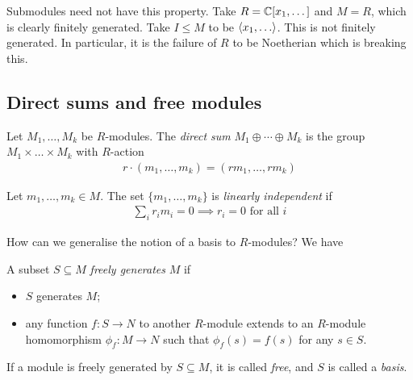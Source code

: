 \documentclass{../../template/note}
\begin{document}
    \begin{remark*}
        Submodules need not have this property. Take $R=\mathbb C[x_1, \dots]$ and $M=R$, which is clearly finitely generated. Take $I \leq M$ to be $\gen{x_1, \dots}$. This is not finitely generated. In particular, it is the failure of $R$ to be Noetherian which is breaking this.
    \end{remark*}
    

    \subsection{Direct sums and free modules}

    \begin{definition}
        Let $M_1, \dots, M_k$ be $R$-modules. The \emph{direct sum} $M_1 \oplus \cdots \oplus M_k$ is the group $M_1 \times \dots \times M_k$ with $R$-action
        \begin{align*}
            r \cdot (m_1, \dots, m_k) = (rm_1, \dots, rm_k)
        \end{align*}
    \end{definition}
    
    \begin{definition}
        Let $m_1, \dots, m_k \in M$. The set $\{m_1, \dots, m_k\}$ is \emph{linearly independent} if
        \begin{align*}
            \sum_i r_im_i = 0 \implies r_i = 0 \text{ for all }i
        \end{align*}
    \end{definition}

    How can we generalise the notion of a basis to $R$-modules? We have

    \begin{definition}
        A subset $S \subseteq M$ \emph{freely generates} $M$ if
        \begin{itemize}
            \item $S$ generates $M$;
            \item any function $f: S \to N$ to another $R$-module extends to an $R$-module homomorphism $\phi_f: M \to N$ such that $\phi_f(s) = f(s)$ for any $s \in S$.
        \end{itemize}
        If a module is freely generated by $S \subseteq M$, it is called \emph{free}, and $S$ is called a \emph{basis}.
    \end{definition}
    
\end{document}
